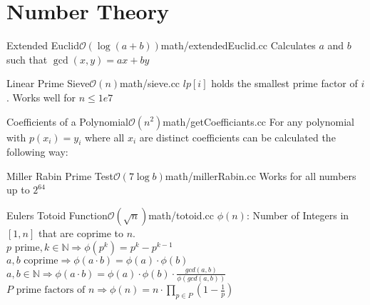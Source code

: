 \section{Number Theory}
\begin{code}{Extended Euclid}{$\mathcal{O}(\log(a + b))$}{math/extendedEuclid.cc} 
 Calculates $a$ and $b$ such that $\gcd(x, y) = ax + by$
\end{code}

\begin{code}{Linear Prime Sieve}{$\mathcal{O}(n)$}{math/sieve.cc}
    $lp[i]$ holds the smallest prime factor of $i$. Works well for $n \leq 1e7$
\end{code}

\begin{code}{Coefficients of a Polynomial}{$\mathcal{O}(n^2)$}{math/getCoefficiants.cc}
  For any polynomial with $p(x_i) = y_i$ where all $x_i$ are distinct coefficients can be calculated the following way:
\end{code}


\begin{code}{Miller Rabin Prime Test}{$\mathcal{O}(7\log b)$}{math/millerRabin.cc}
  Works for all numbers up to $2^{64}$
\end{code}

\begin{code}{Eulers Totoid Function}{$\mathcal{O}(\sqrt{n})$}{math/totoid.cc}
$\phi(n)$: Number of Integers in $[1, n]$ that are coprime to $n$.\\
$p \text{ prime}, k \in \mathbb{N} \Rightarrow \phi(p^k) = p^k - p^{k-1}$ \\
$a, b \text{ coprime} \Rightarrow \phi(a \cdot b) = \phi(a) \cdot \phi(b)$ \\
$a, b \in \mathbb{N} \Rightarrow \phi(a \cdot b) = \phi(a) \cdot \phi(b) \cdot \frac{gcd(a, b)}{\phi(gcd(a,b))}$ \\
$P \text{ prime factors of } n \Rightarrow \phi(n) = n \cdot \prod_{p \in P} (1 - \frac{1}{p})$
\end{code}


